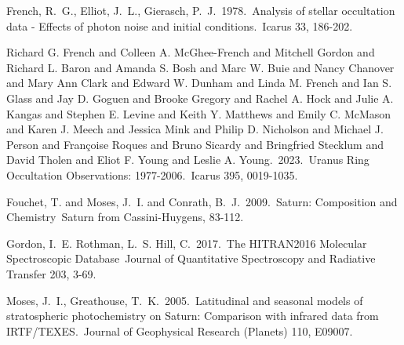 \documentclass[12pt]{article}
\begin{document}
\begin{thebibliography}{28}
 French, R.~G., Elliot, J.~L.,
Gierasch, P.~J.\ 1978.\ Analysis of stellar occultation data - Effects of
photon noise and initial conditions.\ Icarus 33, 186-202.

 Richard G. French and Colleen A.
McGhee-French and Mitchell Gordon and Richard L. Baron and Amanda S. Bosh and
Marc W. Buie and Nancy Chanover and Mary Ann Clark and Edward W. Dunham and
Linda M. French and Ian S. Glass and Jay D. Goguen and Brooke Gregory and
Rachel A. Hock and Julie A. Kangas and Stephen E. Levine and Keith Y. Matthews
and Emily C. McMason and Karen J. Meech and Jessica Mink and Philip D.
Nicholson and Michael J. Person and Françoise Roques and Bruno Sicardy and
Bringfried Stecklum and David Tholen and Eliot F. Young and Leslie A. Young.\
2023.\ Uranus Ring Occultation Observations: 1977-2006.\ Icarus 395, 0019-1035.

 Fouchet, T. and Moses, J.~I. and
Conrath, B.~J.\ 2009.\ Saturn: Composition and Chemistry\ Saturn from
Cassini-Huygens, 83-112.

 {Gordon}, I.~E. {Rothman}, L.~S.
{Hill}, C.\ 2017.\ The HITRAN2016 Molecular Spectroscopic Database\ Journal of
Quantitative Spectroscopy and Radiative Transfer 203, 3-69.

 Moses, J.~I., Greathouse, T.~K.\
2005.\ Latitudinal and seasonal models of stratospheric photochemistry on
Saturn: Comparison with infrared data from IRTF/TEXES.\ Journal of
Geophysical Research (Planets) 110, E09007.

\end{thebibliography}
\end{document}
